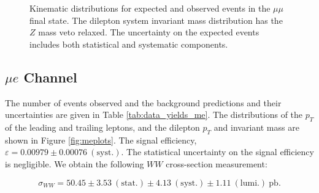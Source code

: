 \begin{figure}[!hbtp]
\begin{center}
\caption{Kinematic distributions for expected and observed events in the $\mu\mu$ final state.
The dilepton system invariant mass distribution has the $Z$ mass veto relaxed.
The uncertainty on the expected events includes both statistical and systematic components.}
\label{fig:mmplots}
\end{center}
\end{figure}

%
%
%
\clearpage
\subsection{$\mu e$ Channel}

The number of events observed and the background predictions and their uncertainties are
given in Table \ref{tab:data_yields_me}.
The distributions of the $p_{T}$ of the leading and trailing leptons, and the dilepton $p_{T}$
and invariant mass are shown in Figure \ref{fig:meplots}.
The signal efficiency,  $\varepsilon = 0.00979 \pm 0.00076~\mathrm{(syst.)}$.
The statistical uncertainty on the signal efficiency is negligible.
We obtain the following $WW$ cross-section measurement:

\begin{equation*}
\sigma_{WW}  = 50.45 \pm 3.53~\mathrm{(stat.)} \pm 4.13~\mathrm{(syst.)} \pm 1.11~\mathrm{(lumi.)~pb}.
\end{equation*}

